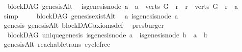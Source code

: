 \begin{isabellebody}
%
\isatagdocument
%
\isamarkuptrue%
%
\endisatagdocument
{\isafolddocument}%
%
\isadelimdocument
%
\endisadelimdocument
{}\isamarkupfalse%
\ {\isacharparenleft}{\kern0pt}\ blockDAG{\isacharparenright}{\kern0pt}\ genesisAlt\ {\isacharcolon}{\kern0pt}\isanewline
\ {\isachardoublequoteopen}{\isacharparenleft}{\kern0pt}is{\isacharunderscore}{\kern0pt}genesis{\isacharunderscore}{\kern0pt}node\ a{\isacharparenright}{\kern0pt}\ {\isasymlongleftrightarrow}\ {\isacharparenleft}{\kern0pt}{\isacharparenleft}{\kern0pt}a\ {\isasymin}\ verts\ G{\isacharparenright}{\kern0pt}\ {\isasymand}\ {\isacharparenleft}{\kern0pt}{\isasymforall}r{\isachardot}{\kern0pt}\ \ {\isacharparenleft}{\kern0pt}r\ {\isasymin}\ verts\ G{\isacharparenright}{\kern0pt}\ {\isasymlongrightarrow}\ r\ {\isasymrightarrow}\isactrlsup {\isacharasterisk}{\kern0pt}\ a{\isacharparenright}{\kern0pt}{\isacharparenright}{\kern0pt}{\isachardoublequoteclose}\isanewline
%
\isadelimproof
\ \ %
\endisadelimproof
%
\isatagproof
{}\isamarkupfalse%
\ simp%
\endisatagproof
{\isafoldproof}%
%
\isadelimproof
\isanewline
%
\endisadelimproof
\ \ \isanewline
{}\isamarkupfalse%
\ {\isacharparenleft}{\kern0pt}\ blockDAG{\isacharparenright}{\kern0pt}\ genesis{\isacharunderscore}{\kern0pt}existAlt{\isacharcolon}{\kern0pt}\isanewline
\ \ {\isachardoublequoteopen}{\isasymexists}a{\isachardot}{\kern0pt}\ is{\isacharunderscore}{\kern0pt}genesis{\isacharunderscore}{\kern0pt}node\ a{\isachardoublequoteclose}\isanewline
%
\isadelimproof
\ \ %
\endisadelimproof
%
\isatagproof
{}\isamarkupfalse%
\ genesis\ genesisAlt\ blockDAG{\isacharunderscore}{\kern0pt}axioms{\isacharunderscore}{\kern0pt}def\ \isamarkupfalse%
\ presburger%
\endisatagproof
{\isafoldproof}%
%
\isadelimproof
\ \isanewline
%
\endisadelimproof
\isanewline
{}\isamarkupfalse%
\ {\isacharparenleft}{\kern0pt}\ blockDAG{\isacharparenright}{\kern0pt}\ unique{\isacharunderscore}{\kern0pt}genesis{\isacharcolon}{\kern0pt}\ {\isachardoublequoteopen}is{\isacharunderscore}{\kern0pt}genesis{\isacharunderscore}{\kern0pt}node\ a\ {\isasymand}\ is{\isacharunderscore}{\kern0pt}genesis{\isacharunderscore}{\kern0pt}node\ b\ {\isasymlongrightarrow}\ a\ {\isacharequal}{\kern0pt}\ b{\isachardoublequoteclose}\isanewline
%
\isadelimproof
\ \ \ \ \ \ %
\endisadelimproof
%
\isatagproof
{}\isamarkupfalse%
\ genesisAlt\ reachable{\isacharunderscore}{\kern0pt}trans\ cycle{\isacharunderscore}{\kern0pt}free\isanewline

\end{isabellebody}

